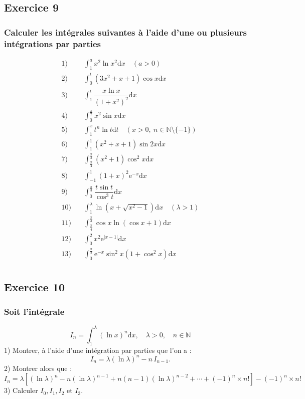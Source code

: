 \documentclass[12pt]{article}
\begin{document}
\subsection*{Exercice 9}
\subsubsection*{Calculer les intégrales suivantes à l'aide d'une ou plusieurs intégrations par parties}
\begin{align*}
1) & \quad \int_{1}^{a}x^{2}\ln x^{2}\mathrm{d}x \quad (a>0)\\
2) & \quad \int_{0}^{t}(3x^{2}+x+1)\cos x\mathrm{d}x \\
3) & \quad \int_{1}^{t}\dfrac{x\ln x}{(1+x^{2})^{2}}\mathrm{d}x \\
4) & \quad \int_{0}^{\frac{\pi}{2}}x^{2}\sin x\mathrm{d}x \\
5) & \quad \int_{1}^{x}t^{n}\ln t\mathrm{d}t \quad (x>0, \ n\in\mathbb{N}\setminus\{-1\})\\
6) & \quad \int_{1}^{1}(x^{2}+x+1)\sin 2x\mathrm{d}x \\
7) & \quad \int_{\frac{\pi}{4}}^{\frac{\pi}{2}}(x^{2}+1)\cos^{2}x\mathrm{d}x \\
8) & \quad \int_{-1}^{1}(1+x)^{2}\mathrm{e}^{-x}\mathrm{d}x \\
9) & \quad \int_{0}^{\frac{\pi}{3}}\dfrac{t\sin t}{\cos^{3}t}\mathrm{d}x \\
10) & \quad \int_{1}^{\lambda}\ln(x+\sqrt{x^{2}-1})\mathrm{d}x \quad (\lambda>1)\\
11) & \quad \int_{\frac{\pi}{4}}^{\frac{\pi}{3}}\cos x\ln(\cos x+1)\mathrm{d}x \\
12) & \quad \int_{0}^{2}x^{2}\mathrm{e}^{|x-1|}\mathrm{d}x \\
13) & \quad \int_{0}^{\frac{\pi}{3}}\mathrm{e}^{-x}\sin^{2}x(1+\cos^{2}x)\mathrm{d}x \\
\end{align*}

\subsection*{Exercice 10}
\subsubsection*{Soit l'intégrale}
\[I_{n}=\int_{1}^{\lambda}(\ln x)^{n}\mathrm{d}x, \quad \lambda>0, \quad n\in\mathbb{N}\]
1) Montrer, à l'aide d'une intégration par parties que l'on a :
\[I_{n}=\lambda(\ln\lambda)^{n}-n\,I_{n-1}.\]
2) Montrer alors que :
\[I_{n}=\lambda[(\ln\lambda)^{n}-n(\ln\lambda)^{n-1}+n(n-1)(\ln\lambda)^{n-2}+\cdots+(-1)^{n}\times n !]-(-1)^{n}\times n !\]
3) Calculer \(I_{0}, I_{1}, I_{2}\) et \(I_{3}.\)
\end{document}
